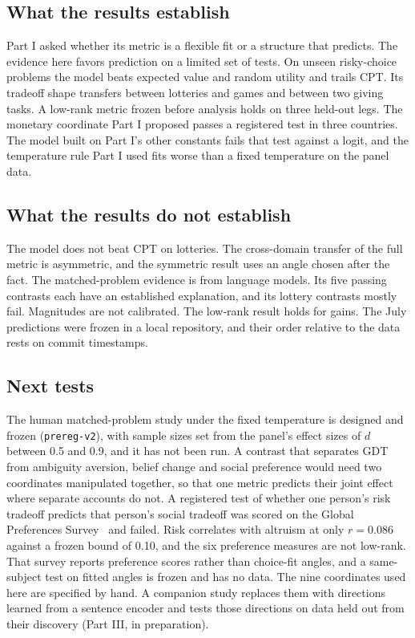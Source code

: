 \documentclass[journal]{IEEEtran}
\begin{document}
\subsection{What the results establish}
Part I asked whether its metric is a flexible fit or a structure that predicts.
The evidence here favors prediction on a limited set of tests.
On unseen risky-choice problems the model beats expected value and random utility and trails CPT.
Its tradeoff shape transfers between lotteries and games and between two giving tasks.
A low-rank metric frozen before analysis holds on three held-out legs.
The monetary coordinate Part I proposed passes a registered test in three countries.
The model built on Part I's other constants fails that test against a logit, and the temperature rule Part I used fits worse than a fixed temperature on the panel data.

\subsection{What the results do not establish}
The model does not beat CPT on lotteries.
The cross-domain transfer of the full metric is asymmetric, and the symmetric result uses an angle chosen after the fact.
The matched-problem evidence is from language models.
Its five passing contrasts each have an established explanation, and its lottery contrasts mostly fail.
Magnitudes are not calibrated.
The low-rank result holds for gains.
The July predictions were frozen in a local repository, and their order relative to the data rests on commit timestamps.

\subsection{Next tests}
The human matched-problem study under the fixed temperature is designed and frozen (\texttt{prereg-v2}), with sample sizes set from the panel's effect sizes of $d$ between 0.5 and 0.9, and it has not been run.
A contrast that separates GDT from ambiguity aversion, belief change and social preference would need two coordinates manipulated together, so that one metric predicts their joint effect where separate accounts do not.
A registered test of whether one person's risk tradeoff predicts that person's social tradeoff was scored on the Global Preferences Survey~\cite{falk2018} and failed.
Risk correlates with altruism at only $r=0.086$ against a frozen bound of 0.10, and the six preference measures are not low-rank.
That survey reports preference scores rather than choice-fit angles, and a same-subject test on fitted angles is frozen and has no data.
The nine coordinates used here are specified by hand.
A companion study replaces them with directions learned from a sentence encoder and tests those directions on data held out from their discovery (Part III, in preparation).
\end{document}
